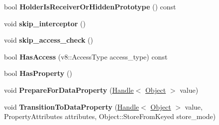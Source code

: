 \begin{DoxyCompactItemize}
\item 
\hypertarget{classv8_1_1internal_1_1_b_a_s_e___e_m_b_e_d_d_e_d_a518f043a2517c9be58a02e3dd13f8344}{}bool {\bfseries Holder\+Is\+Receiver\+Or\+Hidden\+Prototype} () const \label{classv8_1_1internal_1_1_b_a_s_e___e_m_b_e_d_d_e_d_a518f043a2517c9be58a02e3dd13f8344}

\item 
\hypertarget{classv8_1_1internal_1_1_b_a_s_e___e_m_b_e_d_d_e_d_ab388071435ba28ad320b38fad0021f2d}{}void {\bfseries skip\+\_\+interceptor} ()\label{classv8_1_1internal_1_1_b_a_s_e___e_m_b_e_d_d_e_d_ab388071435ba28ad320b38fad0021f2d}

\item 
\hypertarget{classv8_1_1internal_1_1_b_a_s_e___e_m_b_e_d_d_e_d_a97de1c4be8056f9182e43a54b8fcf2ce}{}void {\bfseries skip\+\_\+access\+\_\+check} ()\label{classv8_1_1internal_1_1_b_a_s_e___e_m_b_e_d_d_e_d_a97de1c4be8056f9182e43a54b8fcf2ce}

\item 
\hypertarget{classv8_1_1internal_1_1_b_a_s_e___e_m_b_e_d_d_e_d_a3835fd02a8c31a55e4650e6ae8750699}{}bool {\bfseries Has\+Access} (v8\+::\+Access\+Type access\+\_\+type) const \label{classv8_1_1internal_1_1_b_a_s_e___e_m_b_e_d_d_e_d_a3835fd02a8c31a55e4650e6ae8750699}

\item 
\hypertarget{classv8_1_1internal_1_1_b_a_s_e___e_m_b_e_d_d_e_d_a4d9137f3c7581900c0d84df5c76c70b7}{}bool {\bfseries Has\+Property} ()\label{classv8_1_1internal_1_1_b_a_s_e___e_m_b_e_d_d_e_d_a4d9137f3c7581900c0d84df5c76c70b7}

\item 
\hypertarget{classv8_1_1internal_1_1_b_a_s_e___e_m_b_e_d_d_e_d_a8c07aa36ed1c5f4080020d2851c31417}{}void {\bfseries Prepare\+For\+Data\+Property} (\hyperlink{classv8_1_1internal_1_1_handle}{Handle}$<$ \hyperlink{classv8_1_1internal_1_1_object}{Object} $>$ value)\label{classv8_1_1internal_1_1_b_a_s_e___e_m_b_e_d_d_e_d_a8c07aa36ed1c5f4080020d2851c31417}

\item 
\hypertarget{classv8_1_1internal_1_1_b_a_s_e___e_m_b_e_d_d_e_d_ab8a557561b87d596b425e693fac028a3}{}void {\bfseries Transition\+To\+Data\+Property} (\hyperlink{classv8_1_1internal_1_1_handle}{Handle}$<$ \hyperlink{classv8_1_1internal_1_1_object}{Object} $>$ value, Property\+Attributes attributes, Object\+::\+Store\+From\+Keyed store\+\_\+mode)\label{classv8_1_1internal_1_1_b_a_s_e___e_m_b_e_d_d_e_d_ab8a557561b87d596b425e693fac028a3}


\end{DoxyCompactItemize}
